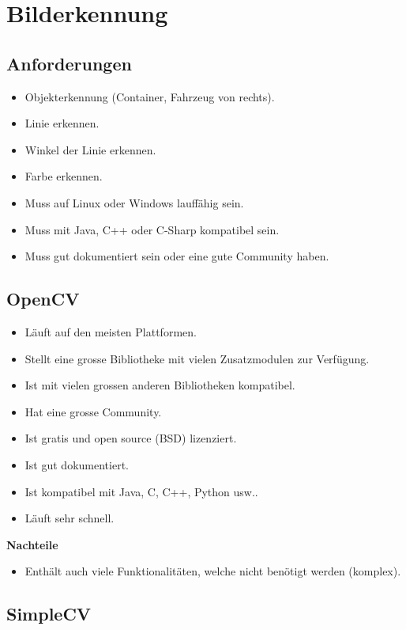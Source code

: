 \section{Bilderkennung}

\subsection {Anforderungen}
\begin{itemize}
\item Objekterkennung (Container, Fahrzeug von rechts).
\item Linie erkennen.
\item Winkel der Linie erkennen.
\item Farbe erkennen.
\item Muss auf Linux oder Windows lauffähig sein.
\item Muss mit Java, C++ oder C-Sharp kompatibel sein.
\item Muss gut dokumentiert sein oder eine gute Community haben.
\end{itemize}

\subsection {OpenCV}

\begin{itemize}
\item Läuft auf den meisten Plattformen.
\item Stellt eine grosse Bibliotheke mit vielen Zusatzmodulen zur Verfügung.
\item Ist mit vielen grossen anderen Bibliotheken kompatibel.
\item Hat eine grosse Community.
\item Ist gratis und open source (BSD) lizenziert.
\item Ist gut dokumentiert.
\item Ist kompatibel mit Java, C, C++, Python usw..
\item Läuft sehr schnell.
\end{itemize}

\textbf {Nachteile}
\begin{itemize}
\item Enthält auch viele Funktionalitäten, welche nicht benötigt werden (komplex).		
\end{itemize}

\subsection {SimpleCV}


